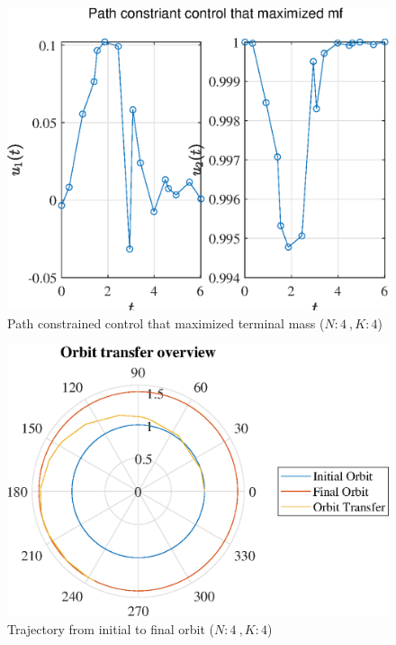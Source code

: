 \documentclass[]{article}
\begin{document}
	\begin{figure}
		\centering
		\includegraphics[scale=0.75]{path_N4_K4_C3_mf.eps}
		\caption{Path constrained control that maximized terminal mass (\(N:4\ , K:4\))}
		\label{fig:path_N4_K4_C3_mf}
	\end{figure}
	\begin{figure}
		\centering
		\includegraphics[scale=0.75]{orbit_N4_K4_C3_mf.eps}
		\caption{Trajectory from initial to final orbit (\(N:4\ , K:4\))}
		\label{fig:orbit_N4_K4_C3_mf}
	\end{figure}
\end{document}
